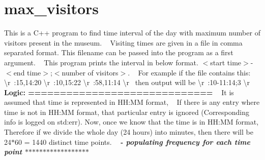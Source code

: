 \chapter{max\+\_\+visitors}
\hypertarget{index}{}\label{index}
\label{index_md__finding_01the_01time_01period}%
%
 This is a C++ program to find time interval of the day with maximum number of visitors present in the museum. ~\newline
Visiting times are given in a file in comma separated format. This filename can be passed into the program as a first argument. ~\newline
This program prints the interval in below format. $<$start time$>$-\/$<$end time$>$;$<$number of visitors$>$. ~\newline
For example if the file contains this\+: \textbackslash{}r~\+:15,14\+:20 \textbackslash{}r~\+:10,15\+:22 \textbackslash{}r~\+:58,11\+:14 \textbackslash{}r~\newline
then output will be \textbackslash{}r~\+:10-\/11\+:14;3 \textbackslash{}r~\newline
~\newline
{\bfseries{Logic\+: ============================= }}~\newline
It is assumed that time is represented in HH\+:MM format, ~\newline
If there is any entry where time is not in HH\+:MM format, that particular entry is ignored (Corresponding info is logged on std\+:err). Now, once we know that the time is in HH\+:MM format, Therefore if we divide the whole day (24 hours) into minutes, then there will be 24\texorpdfstring{$\ast$}{*}60 = 1440 distinct time points. ~\newline
 {\bfseries{{\itshape  -\/ populating frequency for each time point \texorpdfstring{$\ast$}{*}\texorpdfstring{$\ast$}{*}\texorpdfstring{$\ast$}{*}\texorpdfstring{$\ast$}{*}\texorpdfstring{$\ast$}{*}\texorpdfstring{$\ast$}{*}\texorpdfstring{$\ast$}{*}\texorpdfstring{$\ast$}{*}\texorpdfstring{$\ast$}{*}\texorpdfstring{$\ast$}{*}\texorpdfstring{$\ast$}{*}\texorpdfstring{$\ast$}{*}\texorpdfstring{$\ast$}{*}\texorpdfstring{$\ast$}{*}\texorpdfstring{$\ast$}{*}\texorpdfstring{$\ast$}{*}\texorpdfstring{$\ast$}{*}\texorpdfstring{$\ast$}{*} }}} ~\newline
